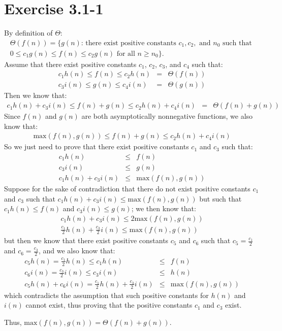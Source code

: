 \documentclass{article}
\begin{document}
\section*{Exercise 3.1-1}

By definition of $\Theta$:
\begin{eqnarray*}
	\Theta(f(n)) = \{g(n) \text{: there exist positive constants } c_1, c_2, \text{ and } n_0 \text{ such that } \\
	0 \leq c_1 g(n) \leq f(n) \leq c_2 g(n) \text{ for all } n \geq n_0\}.
\end{eqnarray*}
Assume that there exist positive constants $c_1$, $c_2$, $c_3$, and $c_4$ such that:
\begin{eqnarray*}
	c_1 h(n) \leq f(n) \leq c_2 h(n) & = & \Theta(f(n)) \\
	c_3 i(n) \leq g(n) \leq c_4 i(n) & = & \Theta(g(n))
\end{eqnarray*}
Then we know that:
\begin{eqnarray*}
	c_1 h(n) + c_3 i(n) \leq f(n) + g(n) \leq c_2 h(n) + c_4 i(n) & = & \Theta(f(n) + g(n))
\end{eqnarray*}
Since $f(n)$ and $g(n)$ are both asymptotically nonnegative functions, we also know that:
\begin{eqnarray*}
	\text{max}(f(n), g(n)) \leq f(n) + g(n) \leq c_2 h(n) + c_4 i(n)
\end{eqnarray*}
So we just need to prove that there exist positive constants $c_1$ and $c_3$ such that:
\begin{eqnarray*}
	c_1 h(n) & \leq & f(n) \\
	c_3 i(n) & \leq & g(n) \\
	c_1 h(n) + c_3 i(n) & \leq & \text{max}(f(n), g(n))
\end{eqnarray*}
Suppose for the sake of contradiction that there do not exist positive constants $c_1$ and $c_3$ such that $c_1 h(n) + c_3 i(n) \leq \text{max}(f(n), g(n))$ but such that $c_1 h(n) \leq f(n)$ and $c_3 i(n) \leq g(n)$; we then know that:
\begin{eqnarray*}
	c_1 h(n) + c_3 i(n) \leq 2 \text{max}(f(n), g(n)) \\
	\frac{c_1}{2} h(n) + \frac{c_3}{2} i(n) \leq \text{max}(f(n), g(n))
\end{eqnarray*}
but then we know that there exist positive constants $c_5$ and $c_6$ such that $c_5 = \frac{c_1}{2}$ and $c_6 = \frac{c_3}{2}$, and we also know that:
\begin{eqnarray*}
	c_5 h(n) = \frac{c_1}{2} h(n) \leq c_1 h(n) & \leq & f(n) \\
	c_6 i(n) = \frac{c_3}{2} i(n) \leq c_3 i(n) & \leq & h(n) \\
	c_5 h(n) + c_6 i(n) = \frac{c_1}{2} h(n) + \frac{c_3}{2} i(n) & \leq & \text{max}(f(n), g(n))
\end{eqnarray*}
which contradicts the assumption that such positive constants for $h(n)$ and $i(n)$ cannot exist, thus proving that the positive constants $c_1$ and $c_3$ exist.

Thus, $\text{max}(f(n), g(n)) = \Theta(f(n) + g(n))$.
\end{document}
